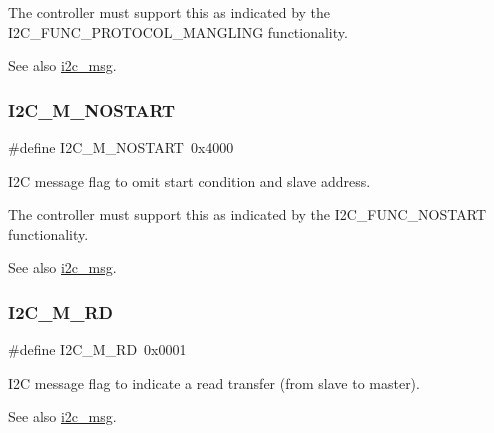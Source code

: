 The controller must support this as indicated by the I2\+C\+\_\+\+F\+U\+N\+C\+\_\+\+P\+R\+O\+T\+O\+C\+O\+L\+\_\+\+M\+A\+N\+G\+L\+I\+NG functionality.

\begin{DoxySeeAlso}{See also}
\mbox{\hyperlink{structi2c__msg}{i2c\+\_\+msg}}. 
\end{DoxySeeAlso}
\mbox{\label{group__I2CLinux_ga7a467d37a113d97496f0fa69c6c15650}} 
\subsubsection{\texorpdfstring{I2C\_M\_NOSTART}{I2C\_M\_NOSTART}}
{\footnotesize\ttfamily \#define I2\+C\+\_\+\+M\+\_\+\+N\+O\+S\+T\+A\+RT~0x4000}



I2C message flag to omit start condition and slave address. 

The controller must support this as indicated by the I2\+C\+\_\+\+F\+U\+N\+C\+\_\+\+N\+O\+S\+T\+A\+RT functionality.

\begin{DoxySeeAlso}{See also}
\mbox{\hyperlink{structi2c__msg}{i2c\+\_\+msg}}. 
\end{DoxySeeAlso}
\mbox{\label{group__I2CLinux_gadb8eddbb89e88c4fc0e44306fc878b85}} 
\subsubsection{\texorpdfstring{I2C\_M\_RD}{I2C\_M\_RD}}
{\footnotesize\ttfamily \#define I2\+C\+\_\+\+M\+\_\+\+RD~0x0001}



I2C message flag to indicate a read transfer (from slave to master). 

\begin{DoxySeeAlso}{See also}
\mbox{\hyperlink{structi2c__msg}{i2c\+\_\+msg}}. 
\end{DoxySeeAlso}
\mbox{\label{group__I2CLinux_gad1b3262018276534d433daaf96648480}} 
